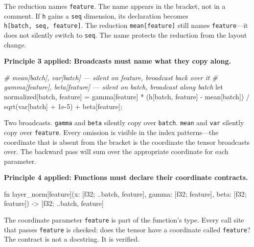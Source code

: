 \documentclass[11pt,titlepage]{article}
\newenvironment{Shaded}{}{}
\newcommand{\CommentTok}[1]{\textcolor[rgb]{0.38,0.63,0.69}{\textit{#1}}}
\newcommand{\FloatTok}[1]{\textcolor[rgb]{0.25,0.63,0.44}{#1}}
\newcommand{\NormalTok}[1]{#1}
\newcommand{\OperatorTok}[1]{\textcolor[rgb]{0.40,0.40,0.40}{#1}}
\begin{document}
The reduction names \texttt{feature}. The name appears in the bracket,
not in a comment. If \texttt{h} gains a \texttt{seq} dimension, its
declaration becomes \texttt{h{[}batch,\ seq,\ feature{]}}. The reduction
\texttt{mean{[}feature{]}} still names \texttt{feature}---it does not
silently switch to \texttt{seq}. The name protects the reduction from
the layout change.

\textbf{Principle 3 applied: Broadcasts must name what they copy along.}

\begin{Shaded}
\begin{Highlighting}[]
\CommentTok{# mean[batch], var[batch] — silent on feature, broadcast back over it}
\CommentTok{# gamma[feature], beta[feature] — silent on batch, broadcast along batch}
\NormalTok{let normalized[batch, feature] }\OperatorTok{=}\NormalTok{ gamma[feature] }\OperatorTok{*}\NormalTok{ (h[batch, feature] }\OperatorTok{-}\NormalTok{ mean[batch]) }\OperatorTok{/}\NormalTok{ sqrt(var[batch] }\OperatorTok{+} \FloatTok{1e-5}\NormalTok{) }\OperatorTok{+}\NormalTok{ beta[feature]}\OperatorTok{;}
\end{Highlighting}
\end{Shaded}

Two broadcasts. \texttt{gamma} and \texttt{beta} silently copy over
\texttt{batch}. \texttt{mean} and \texttt{var} silently copy over
\texttt{feature}. Every omission is visible in the index patterns---the
coordinate that is absent from the bracket is the coordinate the tensor
broadcasts over. The backward pass will sum over the appropriate
coordinate for each parameter.

\textbf{Principle 4 applied: Functions must declare their coordinate
contracts.}

\begin{Shaded}
\begin{Highlighting}[]
\NormalTok{fn layer_norm[feature](x: [f32}\OperatorTok{;}\NormalTok{ ..batch, feature], gamma: [f32}\OperatorTok{;}\NormalTok{ feature], beta: [f32}\OperatorTok{;}\NormalTok{ feature])}
    \OperatorTok{->}\NormalTok{ [f32}\OperatorTok{;}\NormalTok{ ..batch, feature]}
\end{Highlighting}
\end{Shaded}

The coordinate parameter \texttt{feature} is part of the function's
type. Every call site that passes \texttt{feature} is checked: does the
tensor have a coordinate called \texttt{feature}? The contract is not a
docstring. It is verified.
\end{document}
